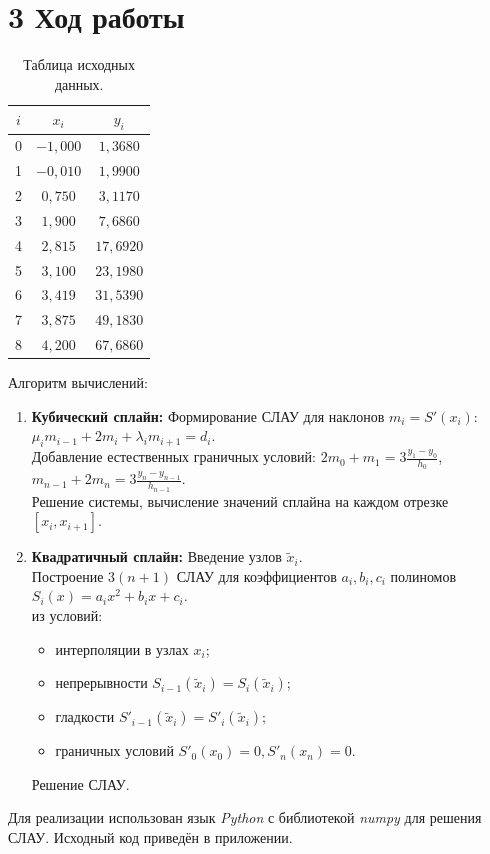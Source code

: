 \documentclass[14pt,a4paper]{extarticle}
\begin{document}
\newpage

\section*{3 Ход работы}
\begin{table}[h]
\centering
\caption{Таблица исходных данных.}
\begin{tabular}{|c|c|c|}
\hline
$i$ & $x_i$ & $y_i$ \\ \hline
0 & $-1{,}000$ & $1{,}3680$ \\ \hline
1 & $-0{,}010$ & $1{,}9900$ \\ \hline
2 & $0{,}750$ & $3{,}1170$ \\ \hline
3 & $1{,}900$ & $7{,}6860$ \\ \hline
4 & $2{,}815$ & $17{,}6920$ \\ \hline
5 & $3{,}100$ & $23{,}1980$ \\ \hline
6 & $3{,}419$ & $31{,}5390$ \\ \hline
7 & $3{,}875$ & $49{,}1830$ \\ \hline
8 & $4{,}200$ & $67{,}6860$ \\ \hline
\end{tabular}
\end{table}

Алгоритм вычислений:
\begin{enumerate}
    \item \textbf{Кубический сплайн:} Формирование СЛАУ для наклонов $m_i = S'(x_i)$:
    $\mu_i m_{i-1} + 2m_i + \lambda_i m_{i+1} = d_i$. \\
    Добавление естественных граничных условий: $2m_0 + m_1 = 3\frac{y_1-y_0}{h_0}$, $m_{n-1} + 2m_n = 3\frac{y_n-y_{n-1}}{h_{n-1}}$.\\
    Решение системы, вычисление значений сплайна на каждом отрезке $[x_i, x_{i+1}]$.
    \item \textbf{Квадратичный сплайн:} Введение узлов $\tilde{x}_i$. \\
    Построение $3(n+1)$ СЛАУ для коэффициентов $a_i, b_i, c_i$ полиномов $S_i(x) = a_i x^2 + b_i x + c_i$.\\ из условий:
    \begin{itemize}
        \item интерполяции в узлах $x_i$;
        \item непрерывности $S_{i-1}(\tilde{x}_i) = S_i(\tilde{x}_i)$;
        \item гладкости $S'_{i-1}(\tilde{x}_i) = S'_i(\tilde{x}_i)$;
        \item граничных условий $S'_0(x_0)=0, S'_n(x_n)=0$.
    \end{itemize}
    Решение СЛАУ.
\end{enumerate}
Для реализации использован язык \textit{Python} с библиотекой \textit{numpy} для решения СЛАУ. Исходный код приведён в приложении.
\end{document}
